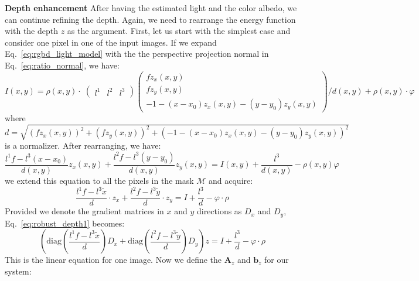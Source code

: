 \textbf{Depth enhancement}
After having the estimated light and the color albedo, we can continue refining the depth.
Again, we need to rearrange the energy function with the depth $z$ as the argument.
First, let us start with the simplest case and consider one pixel in one of the input images.
If we expand Eq.~\ref{eq:rgbd_light_model} with the the perspective projection normal in Eq.~\ref{eq:ratio_normal}, we have:
\begin{equation}
    I(x,y) = \rho(x,y) \cdot \; 
    \begin{pmatrix}
        l^1 & l^2 & l^3 
    \end{pmatrix}
     \begin{pmatrix}
         fz_x(x,y)\\
         fz_y(x,y)\\
         -1 - (x - x_0)z_x(x,y) - (y - y_0)z_y(x,y)
     \end{pmatrix}/ d(x,y)
     + \rho(x,y) \cdot \varphi   
\end{equation}
where $d = \sqrt{(fz_x(x,y))^2 + (fz_y(x,y))^2 + (-1 - (x - x_0)z_x(x,y) - (y - y_0)z_y(x,y))^2}$ is a normalizer.
After rearranging, we have:
\begin{equation}
    \frac{l^1f - l^3(x-x_0)}{d(x,y)}z_x(x,y) + \frac{l^2f - l^3(y-y_0)}{d(x,y)}z_y(x,y) = I(x,y) + \frac{l^3}{d(x,y)} - \rho(x,y)\varphi
\end{equation}
we extend this equation to all the pixels in the mask $\mathcal{M}$ and acquire:
\begin{equation}\label{eq:robust_depth1}
    \frac{l^1f - l^3\tilde{x}}{d} \cdot z_x + \frac{l^2f - l^3\tilde{y}}{d} \cdot z_y = I + \frac{l^3}{d} - \varphi \cdot \rho
\end{equation}
Provided we denote the gradient matrices in $x$ and $y$ directions as $D_x$ and $D_y$, Eq.~\ref{eq:robust_depth1} becomes:
\begin{equation}\label{eq:robust_depth2}
        \left(\text{diag}(\frac{l^1f - l^3\tilde{x}}{d}) D_x + \text{diag}(\frac{l^2f - l^3\tilde{y}}{d}) D_y\right) z = I + \frac{l^3}{d} - \varphi \cdot \rho
\end{equation}
This is the linear equation for one image. 
Now we define the $\mathbf{A}_z$ and $\mathbf{b}_z$ for our system:
